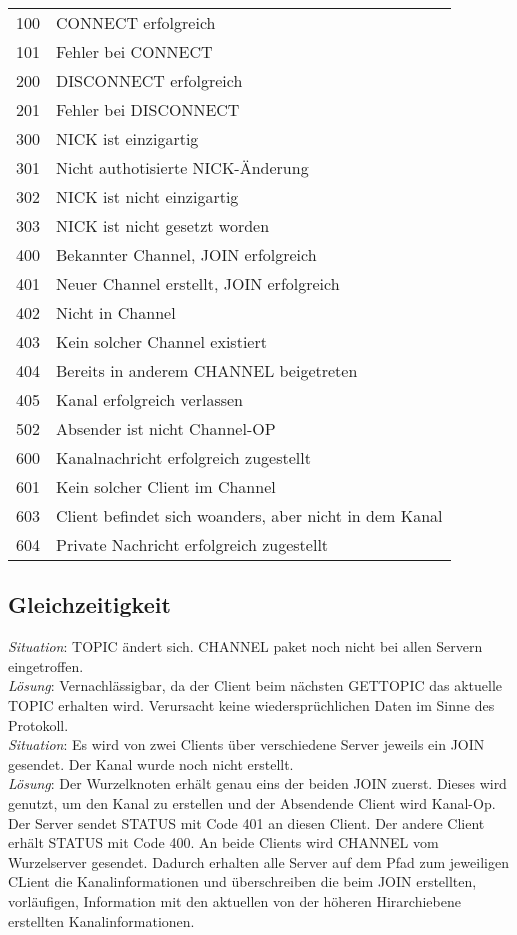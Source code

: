 \documentclass{article}
\begin{document}
\begin{tabular}{rl}
  100 & CONNECT erfolgreich \\
  101 & Fehler bei CONNECT \\
  200 & DISCONNECT erfolgreich \\
  201 & Fehler bei DISCONNECT \\
  300 & NICK ist einzigartig \\
  301 & Nicht authotisierte NICK-Änderung \\
  302 & NICK ist nicht einzigartig \\
  303 & NICK ist nicht gesetzt worden \\
  400 & Bekannter Channel, JOIN erfolgreich \\
  401 & Neuer Channel erstellt, JOIN erfolgreich \\
  402 & Nicht in Channel \\
  403 & Kein solcher Channel existiert \\
  404 & Bereits in anderem CHANNEL beigetreten \\
  405 & Kanal erfolgreich verlassen \\
  502 & Absender ist nicht Channel-OP \\
  600 & Kanalnachricht erfolgreich zugestellt \\
  601 & Kein solcher Client im Channel \\
  603 & Client befindet sich woanders, aber nicht in dem Kanal \\
  604 & Private Nachricht erfolgreich zugestellt \\
\end{tabular}

\subsection{Gleichzeitigkeit}

\emph{Situation}: TOPIC ändert sich. CHANNEL paket noch nicht bei allen Servern eingetroffen.\\
\emph{Lösung}: Vernachlässigbar, da der Client beim nächsten GETTOPIC das aktuelle TOPIC erhalten wird. Verursacht keine wiedersprüchlichen Daten im Sinne des Protokoll.\\

\emph{Situation}: Es wird von zwei Clients über verschiedene Server jeweils ein JOIN gesendet. Der Kanal wurde noch  nicht erstellt.\\
\emph{Lösung}: Der Wurzelknoten erhält genau eins der beiden JOIN zuerst. Dieses wird genutzt, um den Kanal zu erstellen und der Absendende Client wird Kanal-Op. Der Server sendet STATUS mit Code 401 an diesen Client. Der andere Client erhält STATUS mit Code 400. An beide Clients wird CHANNEL vom Wurzelserver gesendet. Dadurch erhalten alle Server auf dem Pfad zum jeweiligen CLient die Kanalinformationen und überschreiben die beim JOIN erstellten, vorläufigen, Information mit den aktuellen von der höheren Hirarchiebene erstellten Kanalinformationen.
\end{document}
